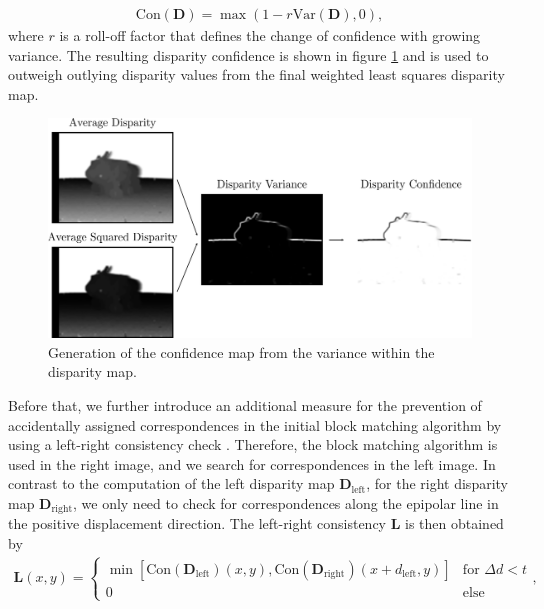 \begin{align}
	\text{Con}(\bm{D}) = \max\left(1-r\text{Var}(\bm{D}),0\right),
\end{align}
where $r$ is a roll-off factor that defines the change of confidence with growing variance. The resulting disparity confidence is shown in figure \ref{fig::331_confidence_map} and is used to outweigh outlying disparity values from the final weighted least squares disparity map. 
\begin{figure}[h!]
	\centering
	\includegraphics[scale=.28]{chapters/03_principles_of_machine_learning/img/confidence_map.png}
	\caption{Generation of the confidence map from the variance within the disparity map.}
	\label{fig::331_confidence_map}
\end{figure}
Before that, we further introduce an additional measure for the prevention of accidentally assigned correspondences in the initial block matching algorithm by using a left-right consistency check \cite{egnal2004stereo}. Therefore, the block matching algorithm is used in the right image, and we search for correspondences in the left image. In contrast to the computation of the left disparity map $\bm{D}_\text{left}$, for the right disparity map $\bm{D}_\text{right}$, we only need to check for correspondences along the epipolar line in the positive displacement direction. The left-right consistency $\bm{L}$ is then obtained by 
\begin{align}
	\bm{L}(x, y) = 
	\begin{cases}
	\min \left[\text{Con}(\bm{D}_\text{left})(x, y), \text{Con}(\bm{D}_\text{right})(x + d_\text{left}, y)\right] & \text{for } \Delta d < t  \\
	0 & \text{else}
	\end{cases},
\end{align}
